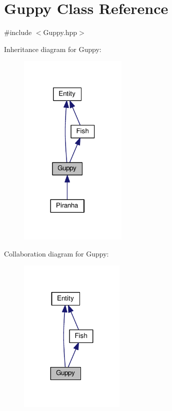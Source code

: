 \hypertarget{classGuppy}{}\section{Guppy Class Reference}
\label{classGuppy}


{\ttfamily \#include $<$Guppy.\+hpp$>$}



Inheritance diagram for Guppy\+:\nopagebreak
\begin{figure}[H]
\begin{center}
\leavevmode
\includegraphics[width=146pt]{classGuppy__inherit__graph}
\end{center}
\end{figure}


Collaboration diagram for Guppy\+:\nopagebreak
\begin{figure}[H]
\begin{center}
\leavevmode
\includegraphics[width=143pt]{classGuppy__coll__graph}
\end{center}
\end{figure}
